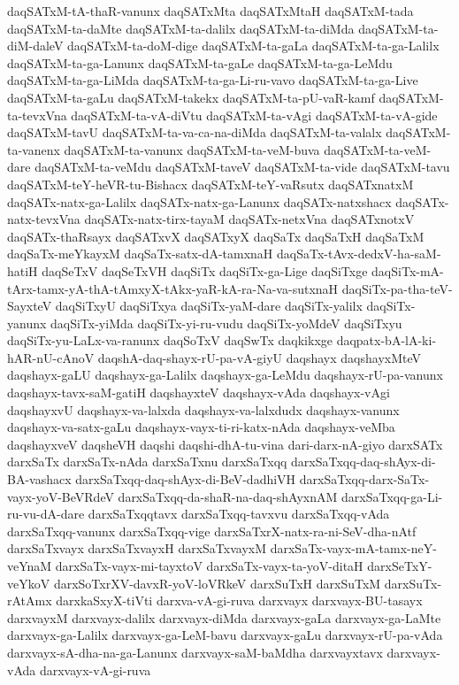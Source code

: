 {daqSATxM-tA-thaR-vanunx
daqSATxMta
daqSATxMtaH
daqSATxM-tada
daqSATxM-ta-daMte
daqSATxM-ta-dalilx
daqSATxM-ta-diMda
daqSATxM-ta-diM-daleV
daqSATxM-ta-doM-dige
daqSATxM-ta-gaLa
daqSATxM-ta-ga-Lalilx
daqSATxM-ta-ga-Lanunx
daqSATxM-ta-gaLe
daqSATxM-ta-ga-LeMdu
daqSATxM-ta-ga-LiMda
daqSATxM-ta-ga-Li-ru-vavo
daqSATxM-ta-ga-Live
daqSATxM-ta-gaLu
daqSATxM-takekx
daqSATxM-ta-pU-vaR-kamf
daqSATxM-ta-tevxVna
daqSATxM-ta-vA-diVtu
daqSATxM-ta-vAgi
daqSATxM-ta-vA-gide
daqSATxM-tavU
daqSATxM-ta-va-ca-na-diMda
daqSATxM-ta-valalx
daqSATxM-ta-vanenx
daqSATxM-ta-vanunx
daqSATxM-ta-veM-buva
daqSATxM-ta-veM-dare
daqSATxM-ta-veMdu
daqSATxM-taveV
daqSATxM-ta-vide
daqSATxM-tavu
daqSATxM-teY-heVR-tu-Bishacx
daqSATxM-teY-vaRsutx
daqSATxnatxM
daqSATx-natx-ga-Lalilx
daqSATx-natx-ga-Lanunx
daqSATx-natxshacx
daqSATx-natx-tevxVna
daqSATx-natx-tirx-tayaM
daqSATx-netxVna
daqSATxnotxV
daqSATx-thaRsayx
daqSATxvX
daqSATxyX
daqSaTx
daqSaTxH
daqSaTxM
daqSaTx-meYkayxM
daqSaTx-satx-dA-tamxnaH
daqSaTx-tAvx-dedxV-ha-saM-hatiH
daqSeTxV
daqSeTxVH
daqSiTx
daqSiTx-ga-Lige
daqSiTxge
daqSiTx-mA-tArx-tamx-yA-thA-tAmxyX-tAkx-yaR-kA-ra-Na-va-sutxnaH
daqSiTx-pa-tha-teV-SayxteV
daqSiTxyU
daqSiTxya
daqSiTx-yaM-dare
daqSiTx-yalilx
daqSiTx-yanunx
daqSiTx-yiMda
daqSiTx-yi-ru-vudu
daqSiTx-yoMdeV
daqSiTxyu
daqSiTx-yu-LaLx-va-ranunx
daqSoTxV
daqSwTx
daqkikxge
daqpatx-bA-lA-ki-hAR-nU-cAnoV
daqshA-daq-shayx-rU-pa-vA-giyU
daqshayx
daqshayxMteV
daqshayx-gaLU
daqshayx-ga-Lalilx
daqshayx-ga-LeMdu
daqshayx-rU-pa-vanunx
daqshayx-tavx-saM-gatiH
daqshayxteV
daqshayx-vAda
daqshayx-vAgi
daqshayxvU
daqshayx-va-lalxda
daqshayx-va-lalxdudx
daqshayx-vanunx
daqshayx-va-satx-gaLu
daqshayx-vayx-ti-ri-katx-nAda
daqshayx-veMba
daqshayxveV
daqsheVH
daqshi
daqshi-dhA-tu-vina
dari-darx-nA-giyo
darxSATx
darxSaTx
darxSaTx-nAda
darxSaTxnu
darxSaTxqq
darxSaTxqq-daq-shAyx-di-BA-vashacx
darxSaTxqq-daq-shAyx-di-BeV-dadhiVH
darxSaTxqq-darx-SaTx-vayx-yoV-BeVRdeV
darxSaTxqq-da-shaR-na-daq-shAyxnAM
darxSaTxqq-ga-Li-ru-vu-dA-dare
darxSaTxqqtavx
darxSaTxqq-tavxvu
darxSaTxqq-vAda
darxSaTxqq-vanunx
darxSaTxqq-vige
darxSaTxrX-natx-ra-ni-SeV-dha-nAtf
darxSaTxvayx
darxSaTxvayxH
darxSaTxvayxM
darxSaTx-vayx-mA-tamx-neY-veYnaM
darxSaTx-vayx-mi-tayxtoV
darxSaTx-vayx-ta-yoV-ditaH
darxSeTxY-veYkoV
darxSoTxrXV-davxR-yoV-loVRkeV
darxSuTxH
darxSuTxM
darxSuTx-rAtAmx
darxkaSxyX-tiVti
darxva-vA-gi-ruva
darxvayx
darxvayx-BU-tasayx
darxvayxM
darxvayx-dalilx
darxvayx-diMda
darxvayx-gaLa
darxvayx-ga-LaMte
darxvayx-ga-Lalilx
darxvayx-ga-LeM-bavu
darxvayx-gaLu
darxvayx-rU-pa-vAda
darxvayx-sA-dha-na-ga-Lanunx
darxvayx-saM-baMdha
darxvayxtavx
darxvayx-vAda
darxvayx-vA-gi-ruva
}
